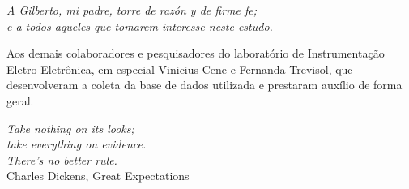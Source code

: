 
\begin{dedicatoria}
	\vspace*{\fill}
	\centering
	\noindent
	\textit{ A Gilberto, mi padre, torre de razón y de firme fe; \\ e a todos aqueles que tomarem interesse neste estudo.} \vspace*{\fill}
\end{dedicatoria}


\begin{agradecimentos}
	Aos demais colaboradores e pesquisadores do laboratório de Instrumentação Eletro-Eletrônica, em especial Vinicius Cene e Fernanda Trevisol, que desenvolveram a coleta da base de dados utilizada e prestaram auxílio de forma geral.
\end{agradecimentos}


\begin{epigrafe}
	\vspace*{\fill}
	\begin{flushright}
		\textit{Take nothing on its looks;\\ take everything on evidence.\\ There's no better rule.}\\ \vspace{\onelineskip}
		Charles Dickens, Great Expectations
	\end{flushright}
\end{epigrafe}


